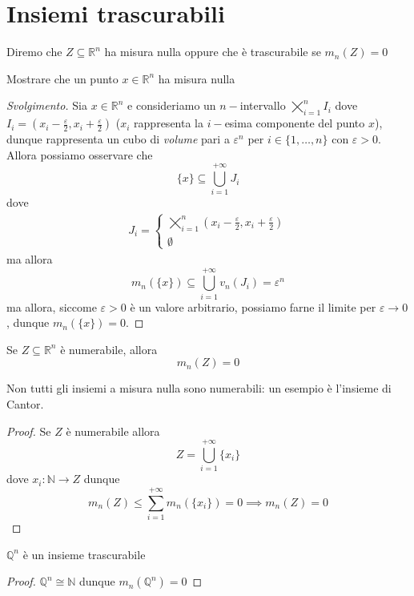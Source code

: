 \section{Insiemi trascurabili}
\begin{definition}
	Diremo che $Z \subseteq \mathbb{R}^n$ ha misura nulla oppure che è trascurabile se $m_n(Z) = 0$
\end{definition}
\begin{exercise}
	Mostrare che un punto $x \in \mathbb{R}^n$ ha misura nulla
\end{exercise}
\begin{proof}[Svolgimento]
	Sia $x \in \mathbb{R}^n$ e consideriamo un $n-$intervallo $\varprod\limits_{i=1}^n I_i$ dove $I_i = (x_i - \frac{\varepsilon}{2}, x_i + \frac{\varepsilon}{2})$ ($x_i$ rappresenta la $i-$esima componente del punto $x$), dunque rappresenta un cubo di \emph{volume} pari a $\varepsilon^n$ per $i \in \{1, \ldots, n \}$ con $\varepsilon > 0$. Allora possiamo osservare che
	$$
	\{ x \} \subseteq \bigcup_{i=1}^{+\infty} J_i
	$$
	dove
	\begin{align*}
		J_i = \begin{cases}
			\varprod\limits_{i=1}^n (x_i - \frac{\varepsilon}{2}, x_i + \frac{\varepsilon}{2}) \\
			\emptyset
		\end{cases}
	\end{align*}
	ma allora
	$$
	m_n(\{ x \}) \subseteq \bigcup_{i=1}^{+\infty} v_n(J_i) = \varepsilon^n
	$$
	ma allora, siccome $\varepsilon > 0$ è un valore arbitrario, possiamo farne il limite per $\varepsilon \to 0$, dunque $m_n(\{ x \}) = 0$.
\end{proof}
\begin{prop}
	Se $Z \subseteq \mathbb{R}^n$ è numerabile, allora
	$$
		m_n(Z) = 0
	$$
\end{prop}
\begin{remark}
	Non tutti gli insiemi a misura nulla sono numerabili: un esempio è l'insieme di Cantor.
\end{remark}
\begin{proof}
	Se $Z$ è numerabile allora
	$$
		Z = \bigcup_{i=1}^{+\infty} \{ x_i \}
	$$
	dove $x_i: \mathbb{N} \to Z$ dunque
	$$
	m_n(Z) \leq \sum_{i=1}^{+\infty} m_n(\{ x_i \}) = 0 \implies m_n(Z) = 0
	$$
\end{proof}
\begin{cor}
	$\mathbb{Q}^n$ è un insieme trascurabile
\end{cor}
\begin{proof}
$\mathbb{Q}^n \cong \mathbb{N}$ dunque $m_n(\mathbb{Q}^n) = 0$
\end{proof}
